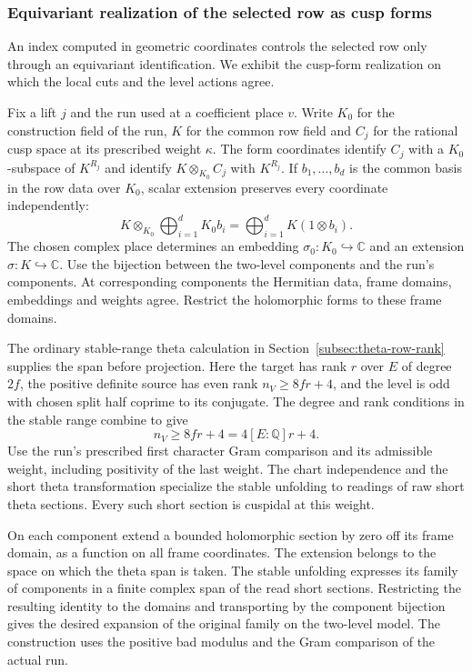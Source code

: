 \subsubsection*{Equivariant realization of the selected row as cusp forms}
\label{subsec:selected-cusp-reading}

An index computed in geometric coordinates controls the selected row only through an equivariant identification. We exhibit the cusp-form realization on which the local cuts and the level actions agree.

Fix a lift $j$ and the run used at a coefficient place $v$.
Write $K_0$ for the construction field of the run, $K$ for
the common row field and $C_j$ for the rational cusp space
at its prescribed weight $\kappa$. The form coordinates
identify $C_j$ with a $K_0$-subspace of $K^{R_j}$ and
identify $K\otimes_{K_0} C_j$ with $K^{R_j}$. If \(b_1,\ldots,b_d\) is the common basis in the row data over \(K_0\), scalar extension preserves every coordinate independently:
\[
  K\otimes_{K_0}\bigoplus_{i=1}^dK_0 b_i=\bigoplus_{i=1}^dK(1\otimes b_i).
\]
 The chosen complex place determines an embedding
$\sigma_0:K_0\hookrightarrow\mathbb C$ and an extension
$\sigma:K\hookrightarrow\mathbb C$. Use the bijection
between the two-level components and the run's components.
At corresponding components the Hermitian data, frame
domains, embeddings and weights agree. Restrict the holomorphic forms to these frame domains.

The ordinary stable-range theta calculation in
Section~\ref{subsec:theta-row-rank} supplies the span before
projection. Here the target has rank $r$ over $E$ of
degree $2f$, the positive definite source has even rank
$n_V\ge 8fr+4$, and the level is odd with chosen split half
coprime to its conjugate.
The degree and rank conditions in the stable range combine to give
\[
  n_V\ge 8fr+4=4[E:\mathbb Q]r+4 .
\]
 Use the run's prescribed first
character Gram comparison and its admissible weight,
including positivity of the last weight. The chart
independence and the short theta transformation specialize
the stable unfolding to readings of raw short theta
sections. Every such short section is cuspidal at this
weight.

On each component extend a bounded holomorphic
section by zero off its frame domain, as a function on
all frame coordinates. The extension belongs to the
space on which the theta span is taken. The stable unfolding
expresses its family of components in a finite complex
span of the read short sections. Restricting the resulting
identity to the domains and transporting by the component
bijection gives the desired expansion of the original
family on the two-level model. The construction uses
the positive bad modulus and the Gram comparison of the
actual run.\label{cor:paired-row-reading-1}

